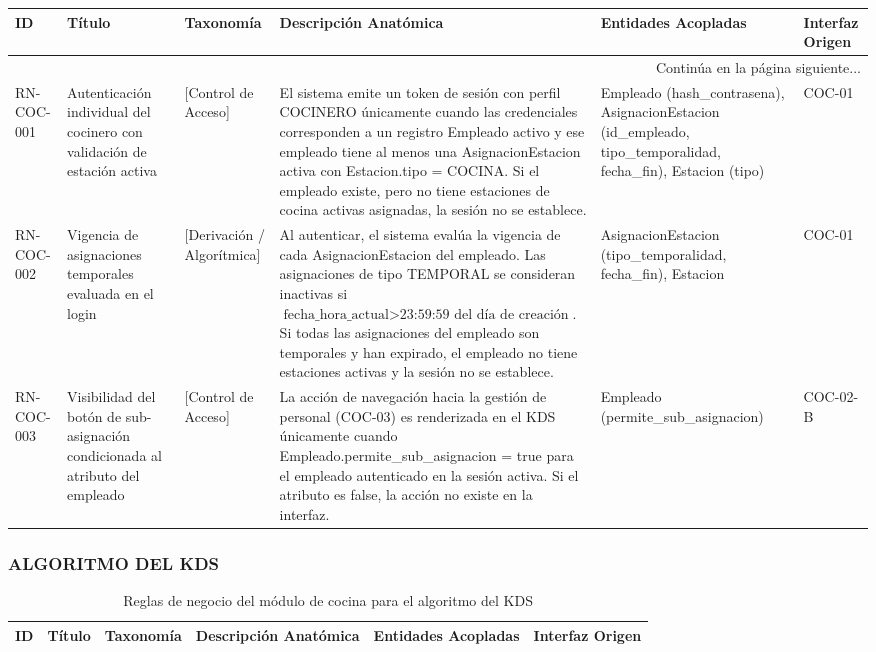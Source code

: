 \begin{landscape}
\begin{longtable}[c]{l p{2.1cm} p{2.1cm} p{8cm} p{4cm} p{3cm}}
\toprule
\textbf{ID} & \textbf{Título} & \textbf{Taxonomía} & \textbf{Descripción Anatómica} & \textbf{Entidades Acopladas} & \textbf{Interfaz Origen} \\
\midrule
\endhead

\midrule
\multicolumn{6}{r}{\small Continúa en la página siguiente...} \\
\endfoot
\bottomrule
\endlastfoot

RN-COC-001 & Autenticación individual del cocinero con validación de estación activa & [Control de Acceso] & El sistema emite un token de sesión con perfil COCINERO únicamente cuando las credenciales corresponden a un registro Empleado activo y ese empleado tiene al menos una AsignacionEstacion activa con Estacion.tipo = COCINA. Si el empleado existe, pero no tiene estaciones de cocina activas asignadas, la sesión no se establece. & Empleado (hash\_contrasena), AsignacionEstacion (id\_empleado, tipo\_temporalidad, fecha\_fin), Estacion (tipo) & COC-01 \\
\addlinespace
RN-COC-002 & Vigencia de asignaciones temporales evaluada en el login & [Derivación / Algorítmica] & Al autenticar, el sistema evalúa la vigencia de cada AsignacionEstacion del empleado. Las asignaciones de tipo TEMPORAL se consideran inactivas si $\text{fecha\_hora\_actual} > \text{23:59:59 del día de creación}$. Si todas las asignaciones del empleado son temporales y han expirado, el empleado no tiene estaciones activas y la sesión no se establece. & AsignacionEstacion (tipo\_temporalidad, fecha\_fin), Estacion & COC-01 \\
\addlinespace
RN-COC-003 & Visibilidad del botón de sub-asignación condicionada al atributo del empleado & [Control de Acceso] & La acción de navegación hacia la gestión de personal (COC-03) es renderizada en el KDS únicamente cuando Empleado.permite\_sub\_asignacion = true para el empleado autenticado en la sesión activa. Si el atributo es false, la acción no existe en la interfaz. & Empleado (permite\_sub\_asignacion) & COC-02-B \\
\end{longtable}
\endgroup

\subsubsection{ALGORITMO DEL KDS}
\begingroup
\setlength{\LTleft}{\fill}
\setlength{\LTright}{\fill}

\begin{longtable}[c]{l p{2.1cm} p{2.1cm} p{8cm} p{4cm} p{3cm}}
\caption{Reglas de negocio del módulo de cocina para el algoritmo del KDS} \label{tab:reglas-negocio-cocina-algoritmo-kds}\\
\toprule
\textbf{ID} & \textbf{Título} & \textbf{Taxonomía} & \textbf{Descripción Anatómica} & \textbf{Entidades Acopladas} & \textbf{Interfaz Origen} \\
\midrule
\endfirsthead


\end{longtable}
\end{landscape}
